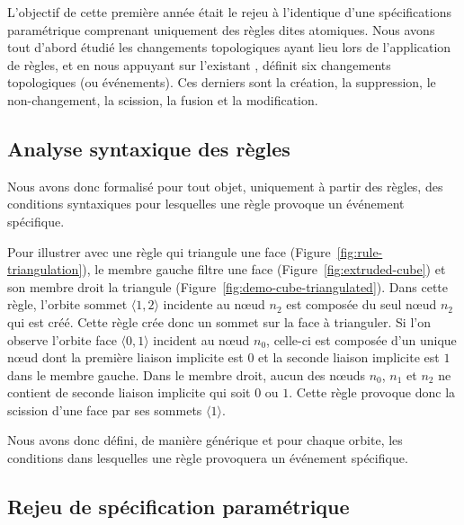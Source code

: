 L'objectif de cette première année était le rejeu à l'identique d'une
spécifications paramétrique comprenant uniquement des règles dites atomiques. %
Nous avons tout d'abord étudié les changements topologiques ayant lieu lors de
l'application de règles, et en nous appuyant sur l'existant \cite{cardo2019},
définit six changements topologiques (ou événements). %
Ces derniers sont la création, la suppression, le non-changement, la scission,
la fusion et la modification.%

\subsection{Analyse syntaxique des règles}

Nous avons donc formalisé pour tout objet, uniquement à partir des règles, des
conditions syntaxiques pour lesquelles une règle provoque un événement
spécifique. %

Pour illustrer avec une règle qui triangule une face
(Figure~\ref{fig:rule-triangulation}), le membre gauche filtre une face
(Figure~\ref{fig:extruded-cube}) et son membre droit la triangule (Figure~\ref{fig:demo-cube-triangulated}). %
Dans cette règle, l'orbite sommet $\langle 1,2 \rangle$ incidente au nœud
$n_{2}$ est composée du seul nœud $n_{2}$ qui est créé. %
Cette règle crée donc un sommet sur la face à trianguler. %
Si l'on observe l'orbite face $\langle 0, 1 \rangle$ incident au nœud $n_{0}$,
celle-ci est composée d'un unique nœud dont la première liaison implicite est
$0$ et la seconde liaison implicite est $1$ dans le membre gauche. %
Dans le membre droit, aucun des nœuds $n_{0}$, $n_{1}$ et $n_{2}$ ne contient de
seconde liaison implicite qui soit $0$ ou $1$. %
Cette règle provoque donc la scission d'une face par ses sommets
$\langle 1 \rangle$. %

Nous avons donc défini, de manière générique et pour chaque orbite,
les conditions dans lesquelles une règle provoquera un événement spécifique. %


\subsection{Rejeu de spécification paramétrique}

